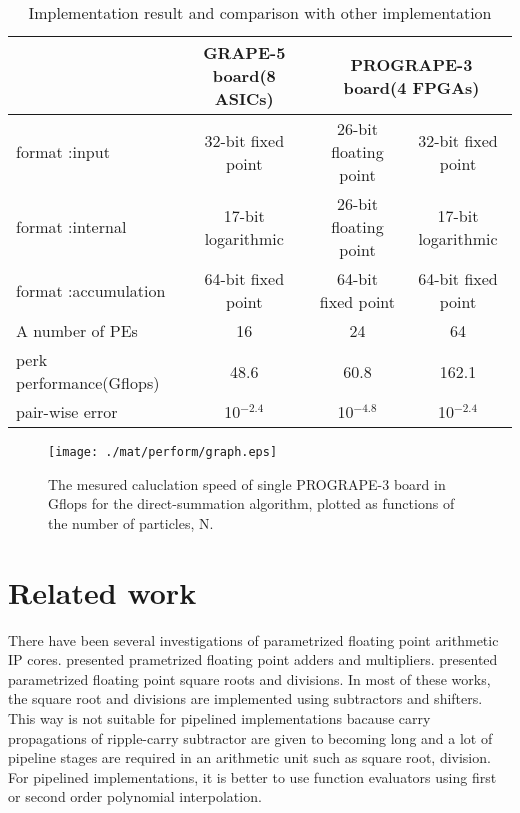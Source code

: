 \documentclass{llncs}
\begin{document}
\begin{table*}
\caption{Implementation result and comparison with other implementation}
\begin{center}
\begin{tabular}{lccc}
\hline
\hline
                     & GRAPE-5 board(8 ASICs) & \multicolumn{2}{c}{PROGRAPE-3 board(4 FPGAs)}  \\
\hline
format :input        & 32-bit fixed point  & 26-bit floating point & 32-bit fixed point \\
format :internal     & 17-bit logarithmic  & 26-bit floating point & 17-bit logarithmic \\
format :accumulation & 64-bit fixed point  & 64-bit fixed point    & 64-bit fixed point \\
A number of PEs      & 16                  &   24                  &   64               \\
perk performance(Gflops)    & 48.6         & 60.8                  & 162.1              \\
pair-wise error             & 10$^{-2.4}$   &  10$^{-4.8}$ & 10$^{-2.4}$                \\

\hline
\hline
\end{tabular}
\end{center}
\label{tabcompg5}
\end{table*}

\begin{figure}[htb]
\begin{center}
\texttt{[image: ./mat/perform/graph.eps]}
\caption{The mesured caluclation speed of single PROGRAPE-3 board in Gflops for the direct-summation algorithm, plotted as functions of the number of particles, N.}
\label{MESURE-PERFORM}
\end{center}
\end{figure}


\section{Related work}

There have been several investigations of parametrized floating point
arithmetic IP cores. \cite{JL01,LCCN03} presented prametrized floating
point adders and multipliers. \cite{LKM02,WN04} presented parametrized
floating point square roots and divisions. In most of these works, the
square root and divisions are implemented using subtractors and
shifters. This way is not suitable for pipelined implementations
bacause carry propagations of ripple-carry subtractor are given to becoming long and
a lot of pipeline stages are required in an arithmetic unit such as square
root, division. For pipelined implementations, it is better to use
function evaluators using first or second order polynomial
interpolation.
\end{document}
